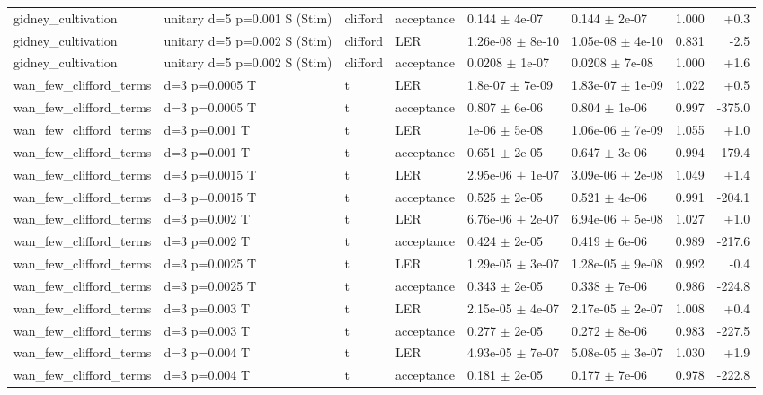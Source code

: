 \documentclass[10pt]{article}
\begin{document}
{\begin{longtable}{l l l l l l r r}
gidney\_cultivation & unitary d=5 p=0.001 S (Stim) & clifford & acceptance & 0.144 $\pm$ 4e-07 & 0.144 $\pm$ 2e-07 & 1.000 & +0.3 \\
gidney\_cultivation & unitary d=5 p=0.002 S (Stim) & clifford & LER & 1.26e-08 $\pm$ 8e-10 & 1.05e-08 $\pm$ 4e-10 & 0.831 & -2.5 \\
gidney\_cultivation & unitary d=5 p=0.002 S (Stim) & clifford & acceptance & 0.0208 $\pm$ 1e-07 & 0.0208 $\pm$ 7e-08 & 1.000 & +1.6 \\
wan\_few\_clifford\_terms & d=3 p=0.0005 T & t & LER & 1.8e-07 $\pm$ 7e-09 & 1.83e-07 $\pm$ 1e-09 & 1.022 & +0.5 \\
wan\_few\_clifford\_terms & d=3 p=0.0005 T & t & acceptance & 0.807 $\pm$ 6e-06 & 0.804 $\pm$ 1e-06 & 0.997 & -375.0 \\
wan\_few\_clifford\_terms & d=3 p=0.001 T & t & LER & 1e-06 $\pm$ 5e-08 & 1.06e-06 $\pm$ 7e-09 & 1.055 & +1.0 \\
wan\_few\_clifford\_terms & d=3 p=0.001 T & t & acceptance & 0.651 $\pm$ 2e-05 & 0.647 $\pm$ 3e-06 & 0.994 & -179.4 \\
wan\_few\_clifford\_terms & d=3 p=0.0015 T & t & LER & 2.95e-06 $\pm$ 1e-07 & 3.09e-06 $\pm$ 2e-08 & 1.049 & +1.4 \\
wan\_few\_clifford\_terms & d=3 p=0.0015 T & t & acceptance & 0.525 $\pm$ 2e-05 & 0.521 $\pm$ 4e-06 & 0.991 & -204.1 \\
wan\_few\_clifford\_terms & d=3 p=0.002 T & t & LER & 6.76e-06 $\pm$ 2e-07 & 6.94e-06 $\pm$ 5e-08 & 1.027 & +1.0 \\
wan\_few\_clifford\_terms & d=3 p=0.002 T & t & acceptance & 0.424 $\pm$ 2e-05 & 0.419 $\pm$ 6e-06 & 0.989 & -217.6 \\
wan\_few\_clifford\_terms & d=3 p=0.0025 T & t & LER & 1.29e-05 $\pm$ 3e-07 & 1.28e-05 $\pm$ 9e-08 & 0.992 & -0.4 \\
wan\_few\_clifford\_terms & d=3 p=0.0025 T & t & acceptance & 0.343 $\pm$ 2e-05 & 0.338 $\pm$ 7e-06 & 0.986 & -224.8 \\
wan\_few\_clifford\_terms & d=3 p=0.003 T & t & LER & 2.15e-05 $\pm$ 4e-07 & 2.17e-05 $\pm$ 2e-07 & 1.008 & +0.4 \\
wan\_few\_clifford\_terms & d=3 p=0.003 T & t & acceptance & 0.277 $\pm$ 2e-05 & 0.272 $\pm$ 8e-06 & 0.983 & -227.5 \\
wan\_few\_clifford\_terms & d=3 p=0.004 T & t & LER & 4.93e-05 $\pm$ 7e-07 & 5.08e-05 $\pm$ 3e-07 & 1.030 & +1.9 \\
wan\_few\_clifford\_terms & d=3 p=0.004 T & t & acceptance & 0.181 $\pm$ 2e-05 & 0.177 $\pm$ 7e-06 & 0.978 & -222.8 \\

\end{longtable}}
\end{document}

